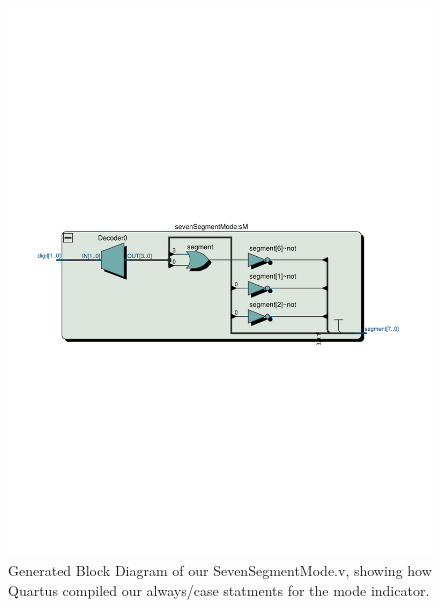 \documentclass[11pt]{article}
\begin{document}
\begin{figure}[H]
    \centering
        \includegraphics[clip, trim=0cm 9cm 0cm 9cm,  width=\textwidth]{SevenSegmentMode}
        \caption{Generated Block Diagram of our SevenSegmentMode.v, showing how Quartus compiled our always/case statments for the mode indicator.}
\end{figure}
\end{document}
